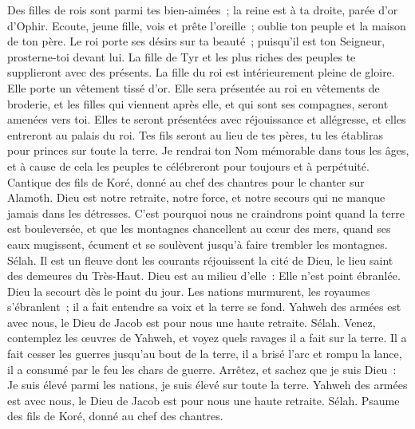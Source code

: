 \begin{multicols}{2}
Des filles de rois sont parmi tes bien-aimées~; la reine est à ta droite, parée d'or d'Ophir.
Ecoute, jeune fille, vois et prête l'oreille~; oublie ton peuple et la maison de ton père.
Le roi porte ses désirs sur ta beauté~; puisqu'il est ton Seigneur, prosterne-toi devant lui.
La fille de Tyr et les plus riches des peuples te supplieront avec des présents.
La fille du roi est intérieurement pleine de gloire. Elle porte un vêtement tissé d'or.
Elle sera présentée au roi en vêtements de broderie, et les filles qui viennent après elle, et qui sont ses compagnes, seront amenées vers toi.
Elles te seront présentées avec réjouissance et allégresse, et elles entreront au palais du roi.
Tes fils seront au lieu de tes pères, tu les établiras pour princes sur toute la terre.
Je rendrai ton Nom mémorable dans tous les âges, et à cause de cela les peuples te célébreront pour toujours et à perpétuité.
\VerseOne{}Cantique des fils de Koré, donné au chef des chantres pour le chanter sur Alamoth. 
Dieu est notre retraite, notre force, et notre secours qui ne manque jamais dans les détresses.
C'est pourquoi nous ne craindrons point quand la terre est bouleversée, et que les montagnes chancellent au cœur des mers,
quand ses eaux mugissent, écument et se soulèvent jusqu'à faire trembler les montagnes. Sélah.
Il est un fleuve dont les courants réjouissent la cité de Dieu, le lieu saint des demeures du Très-Haut.
Dieu est au milieu d'elle~: Elle n'est point ébranlée. Dieu la secourt dès le point du jour.
Les nations murmurent, les royaumes s'ébranlent~; il a fait entendre sa voix et la terre se fond.
Yahweh des armées est avec nous, le Dieu de Jacob est pour nous une haute retraite. Sélah.
Venez, contemplez les œuvres de Yahweh, et voyez quels ravages il a fait sur la terre.
Il a fait cesser les guerres jusqu'au bout de la terre, il a brisé l'arc et rompu la lance, il a consumé par le feu les chars de guerre.
Arrêtez, et sachez que je suis Dieu~: Je suis élevé parmi les nations, je suis élevé sur toute la terre.
Yahweh des armées est avec nous, le Dieu de Jacob est pour nous une haute retraite. Sélah.
\VerseOne{}Psaume des fils de Koré, donné au chef des chantres.

\end{multicols}
